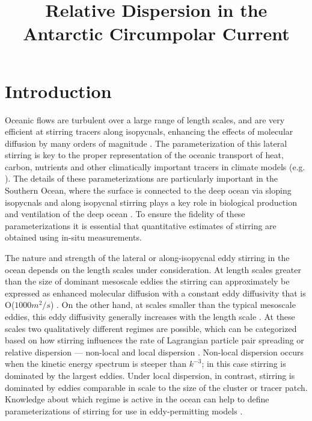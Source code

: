 \documentclass[]{ametsoc}
\title{Relative Dispersion in the Antarctic Circumpolar Current}
\affiliation{School of Oceanography, 
                 University of Washington, Seattle, Washington, USA}
\begin{document}
\maketitle

\section{Introduction}
Oceanic flows are turbulent over a large range of length scales, and are very efficient at stirring tracers along isopycnals, enhancing the effects of molecular diffusion by many orders of magnitude \citep{garrett2006turbulent}. The parameterization of this lateral stirring is key to the proper representation of the oceanic transport of heat, carbon, nutrients and other climatically important tracers in climate models (e.g. \cite{gnandesikan2015, fox2013lateral}). The details of these parameterizations are particularly important in the Southern Ocean, where the surface is connected to the deep ocean via sloping isopycnals and along isopycnal stirring plays a key role in biological production \citep{uchida2019contribution, uchida2020vertical} and ventilation of the deep ocean \citep{marshall2012closure, abernathey2015southern, balwada2018submesoscale, jones2019isopycnal}. To ensure the fidelity of these parameterizations it is essential that quantitative estimates of stirring are obtained using in-situ measurements.

The nature and strength of the lateral or along-isopycnal eddy stirring in the ocean depends on the length scales under consideration. At length scales greater than the size of dominant mesoscale eddies the stirring can approximately be expressed as enhanced molecular diffusion with a constant eddy diffusivity that is O($1000m^2/s$) \citep{zhurbas2003lateral, koszalka2011surface, lacasce2014, balwada2016, roach2016horizontal, roach2018global}. On the other hand, at scales smaller than the typical mesoscale eddies, this eddy diffusivity generally increases with the length scale \citep{richardson1926atmospheric, okubo1971oceanic}. At these scales two qualitatively different regimes are possible, which can be categorized based on how stirring influences the rate of Lagrangian particle pair spreading or relative dispersion --- non-local and local dispersion \citep{bennett1984relative}. Non-local dispersion occurs when the kinetic energy spectrum is steeper than $k^{-3}$; in this case stirring is dominated by the largest eddies. Under local dispersion, in contrast, stirring is dominated by eddies comparable in scale to the size of the cluster or tracer patch. Knowledge about which regime is active in the ocean can help to define parameterizations of stirring for use in eddy-permitting models \citep{cushman2008beyond, kampf2016towards}.
\end{document}
